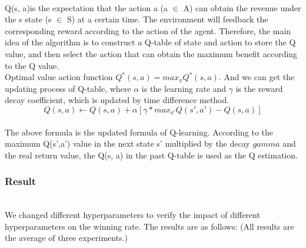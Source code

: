 \documentclass[12pt]{article}
\begin{document}
~\\\indent Q(s, a)is the expectation that the action a (a $\in$ A) can obtain the revenue under the s state (s $\in$ S) at a certain time. The environment will feedback the corresponding reward according to the action of the agent. Therefore, the main idea of the algorithm is to construct a Q-table of state and action to store the Q value, and then select the action that can obtain the maximum benefit according to the Q value.
~\\\indent Optimal value action function $Q^*(s,a) = max_\pi Q^*(s,a)$. And we can get the updating process of Q-table, where $\alpha$ is the learning rate and $\gamma$ is the reward decay coefficient, which is updated by time difference method.
~\\$$Q(s,a) \leftarrow Q(s,a) + \alpha [\gamma * max_{a'}Q(s',a')-Q(s,a)]$$
~\\\indent The above formula is the updated formula of Q-learning. According to the maximum Q(s',a') value in the next state s' multiplied by the decay $gamma$ and the real return value, the Q(s, a) in the past Q-table is used as the Q estimation.

\subsubsection{Result}

~\\\indent We changed different hyperparameters to verify the impact of different hyperparameters on the winning rate. The results are as follows: (All results are the average of three experiments.)
\end{document}
